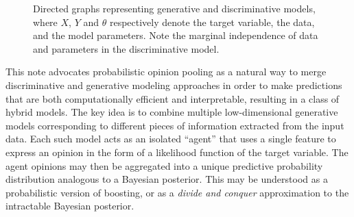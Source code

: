 \documentclass[english]{scrartcl}
\begin{document}

\begin{figure}[!ht]
\begin{center}
\hspace*{.2\textwidth}
\caption{Directed graphs representing generative and discriminative models, where $X$, $Y$ and $\theta$ respectively denote the target variable, the data, and the model parameters. Note the marginal independence of data and parameters in the discriminative model.}
\label{fig:graph_comparison}
\end{center}
\end{figure}

This note advocates probabilistic opinion pooling \cite{Genest-86} as a natural way to merge discriminative and generative modeling approaches in order to make predictions that are both computationally efficient and interpretable, resulting in a class of hybrid models. The key idea is to combine multiple low-dimensional generative models corresponding to different pieces of information extracted from the input data. Each such model acts as an isolated ``agent'' that uses a single feature to express an opinion in the form of a likelihood function of the target variable. The agent opinions may then be aggregated into a unique predictive probability distribution analogous to a Bayesian posterior. This may be understood as a probabilistic version of boosting, or as a {\em divide and conquer} approximation to the intractable Bayesian posterior. 
\end{document}

